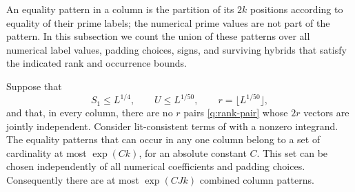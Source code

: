An equality pattern in a column is the partition of its $2k$ positions
according to equality of their prime labels; the numerical prime values
are not part of the pattern.  In this subsection we count the union of
these patterns over all numerical label values, padding choices, signs,
and surviving hybrids that satisfy the indicated rank and occurrence
bounds.

\begin{lemma}\label{q:forest-code}
Suppose that
\[
 S_1\le L^{1/4},\qquad U\le L^{1/50},\qquad
 r=\lfloor L^{1/50}\rfloor,
\]
and that, in every column, there are no $r$ pairs
\eqref{q:rank-pair} whose $2r$ vectors are jointly independent.  Consider
lit-consistent terms of  with a nonzero integrand.  The
equality patterns that can occur in any one column belong to a set
of cardinality at most $\exp(Ck)$, for an absolute constant $C$.
This set can be chosen independently of all numerical coefficients
and padding choices.  Consequently there are at most $\exp(CJk)$
combined column patterns.
\end{lemma}

